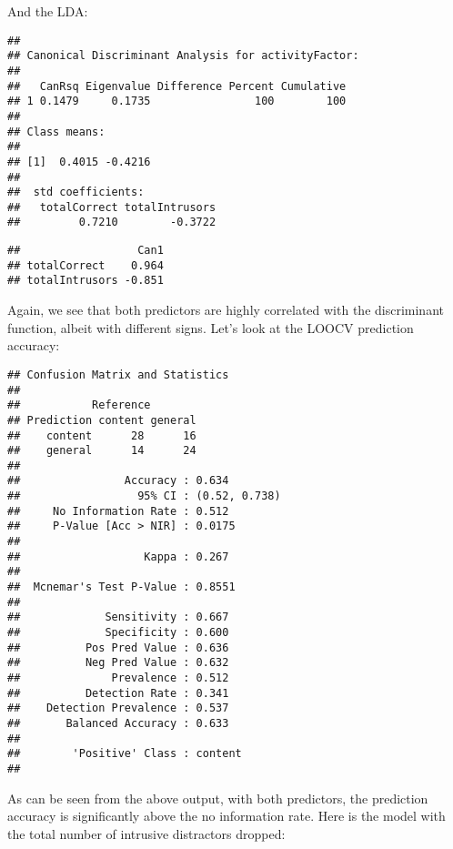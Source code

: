 \documentclass[11pt,]{article}
\begin{document}
And the LDA:

\begin{verbatim}
## 
## Canonical Discriminant Analysis for activityFactor:
## 
##   CanRsq Eigenvalue Difference Percent Cumulative
## 1 0.1479     0.1735                100        100
## 
## Class means:
## 
## [1]  0.4015 -0.4216
## 
##  std coefficients:
##   totalCorrect totalIntrusors 
##         0.7210        -0.3722
\end{verbatim}

\begin{verbatim}
##                  Can1
## totalCorrect    0.964
## totalIntrusors -0.851
\end{verbatim}

Again, we see that both predictors are highly correlated with the
discriminant function, albeit with different signs. Let's look at the
LOOCV prediction accuracy:

\begin{verbatim}
## Confusion Matrix and Statistics
## 
##           Reference
## Prediction content general
##    content      28      16
##    general      14      24
##                                        
##                Accuracy : 0.634        
##                  95% CI : (0.52, 0.738)
##     No Information Rate : 0.512        
##     P-Value [Acc > NIR] : 0.0175       
##                                        
##                   Kappa : 0.267        
##                                        
##  Mcnemar's Test P-Value : 0.8551       
##                                        
##             Sensitivity : 0.667        
##             Specificity : 0.600        
##          Pos Pred Value : 0.636        
##          Neg Pred Value : 0.632        
##              Prevalence : 0.512        
##          Detection Rate : 0.341        
##    Detection Prevalence : 0.537        
##       Balanced Accuracy : 0.633        
##                                        
##        'Positive' Class : content      
## 
\end{verbatim}

As can be seen from the above output, with both predictors, the
prediction accuracy is significantly above the no information rate. Here
is the model with the total number of intrusive distractors dropped:
\end{document}
